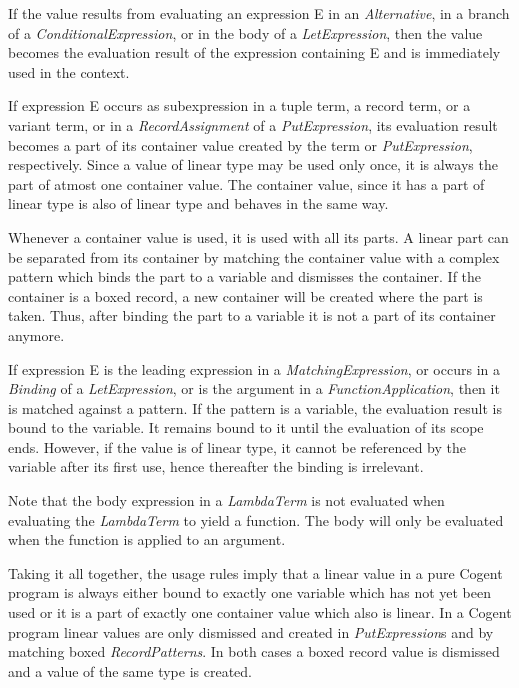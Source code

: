 \documentclass[a4paper]{report}
\newcommand{\cogent}{Cogent\xspace}
\begin{document}
If the value results from evaluating an expression E in an \textit{Alternative}, in a branch of a \textit{ConditionalExpression}, or 
in the body of a \textit{LetExpression}, then the value becomes the evaluation result of the expression containing E and is immediately
used in the context.

If expression E occurs as subexpression in a tuple term, a record term, or a variant term, or in a \textit{RecordAssignment} of
a \textit{PutExpression}, its evaluation result becomes a part of its container value created by the term or \textit{PutExpression}, 
respectively. Since a value of linear type may be used only once, it is always the part of atmost one container value. The container
value, since it has a part of linear type is also of linear type and behaves in the same way. 

Whenever a container value is used, it is used with all its parts. A linear part can be separated from its container by matching the
container value with a complex pattern which binds the part to a variable and dismisses the container. If the container is a boxed
record, a new container will be created where the part is taken. Thus, after binding the part to a variable 
it is not a part of its container anymore.

If expression E is the leading expression in a \textit{MatchingExpression}, or occurs in a \textit{Binding} of a \textit{LetExpression}, 
or is the argument in a \textit{FunctionApplication},
then it is matched against a pattern. If the pattern is a variable, the evaluation result is bound to the variable. It remains bound to
it until the evaluation of its scope ends. However, if the value is of linear type, it cannot be referenced by the variable after
its first use, hence thereafter the binding is irrelevant.

Note that the body expression in a \textit{LambdaTerm} is not evaluated when evaluating the \textit{LambdaTerm} to yield a function.
The body will only be evaluated when the function is applied to an argument.

Taking it all together, the usage rules imply that a linear value in a pure \cogent program is always either bound to exactly one variable 
which has not yet been used or it is a part of exactly one container value which also is linear. In a \cogent program linear values are 
only dismissed and created in \textit{PutExpression}s and by matching boxed \textit{RecordPatterns}. In both cases a boxed record value is 
dismissed and a value of the same type is created.
\end{document}
